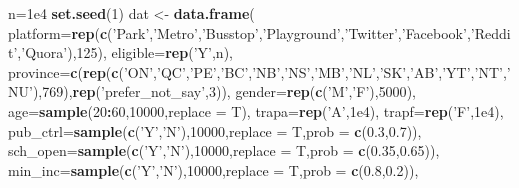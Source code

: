 \documentclass[
]{article}
\newenvironment{Shaded}{\begin{snugshade}}{\end{snugshade}}
\newcommand{\DataTypeTok}[1]{\textcolor[rgb]{0.13,0.29,0.53}{#1}}
\newcommand{\DecValTok}[1]{\textcolor[rgb]{0.00,0.00,0.81}{#1}}
\newcommand{\FloatTok}[1]{\textcolor[rgb]{0.00,0.00,0.81}{#1}}
\newcommand{\KeywordTok}[1]{\textcolor[rgb]{0.13,0.29,0.53}{\textbf{#1}}}
\newcommand{\NormalTok}[1]{#1}
\newcommand{\OperatorTok}[1]{\textcolor[rgb]{0.81,0.36,0.00}{\textbf{#1}}}
\newcommand{\StringTok}[1]{\textcolor[rgb]{0.31,0.60,0.02}{#1}}
\begin{document}
\begin{Shaded}
\begin{Highlighting}[]
\NormalTok{n=}\FloatTok{1e4}
\KeywordTok{set.seed}\NormalTok{(}\DecValTok{1}\NormalTok{)}
\NormalTok{dat <-}\StringTok{ }\KeywordTok{data.frame}\NormalTok{(}
  \DataTypeTok{platform=}\KeywordTok{rep}\NormalTok{(}\KeywordTok{c}\NormalTok{(}\StringTok{'Park'}\NormalTok{,}\StringTok{'Metro'}\NormalTok{,}\StringTok{'Busstop'}\NormalTok{,}\StringTok{'Playground'}\NormalTok{,}\StringTok{'Twitter'}\NormalTok{,}\StringTok{'Facebook'}\NormalTok{,}\StringTok{'Reddit'}\NormalTok{,}\StringTok{'Quora'}\NormalTok{),}\DecValTok{125}\NormalTok{),}
  \DataTypeTok{eligible=}\KeywordTok{rep}\NormalTok{(}\StringTok{'Y'}\NormalTok{,n),}
  \DataTypeTok{province=}\KeywordTok{c}\NormalTok{(}\KeywordTok{rep}\NormalTok{(}\KeywordTok{c}\NormalTok{(}\StringTok{'ON'}\NormalTok{,}\StringTok{'QC'}\NormalTok{,}\StringTok{'PE'}\NormalTok{,}\StringTok{'BC'}\NormalTok{,}\StringTok{'NB'}\NormalTok{,}\StringTok{'NS'}\NormalTok{,}\StringTok{'MB'}\NormalTok{,}\StringTok{'NL'}\NormalTok{,}\StringTok{'SK'}\NormalTok{,}\StringTok{'AB'}\NormalTok{,}\StringTok{'YT'}\NormalTok{,}\StringTok{'NT'}\NormalTok{,}\StringTok{'NU'}\NormalTok{),}\DecValTok{769}\NormalTok{),}\KeywordTok{rep}\NormalTok{(}\StringTok{'prefer_not_say'}\NormalTok{,}\DecValTok{3}\NormalTok{)),}
  \DataTypeTok{gender=}\KeywordTok{rep}\NormalTok{(}\KeywordTok{c}\NormalTok{(}\StringTok{'M'}\NormalTok{,}\StringTok{'F'}\NormalTok{),}\DecValTok{5000}\NormalTok{),}
  \DataTypeTok{age=}\KeywordTok{sample}\NormalTok{(}\DecValTok{20}\OperatorTok{:}\DecValTok{60}\NormalTok{,}\DecValTok{10000}\NormalTok{,}\DataTypeTok{replace =}\NormalTok{ T),}
  \DataTypeTok{trapa=}\KeywordTok{rep}\NormalTok{(}\StringTok{'A'}\NormalTok{,}\FloatTok{1e4}\NormalTok{),}
  \DataTypeTok{trapf=}\KeywordTok{rep}\NormalTok{(}\StringTok{'F'}\NormalTok{,}\FloatTok{1e4}\NormalTok{),}
  \DataTypeTok{pub_ctrl=}\KeywordTok{sample}\NormalTok{(}\KeywordTok{c}\NormalTok{(}\StringTok{'Y'}\NormalTok{,}\StringTok{'N'}\NormalTok{),}\DecValTok{10000}\NormalTok{,}\DataTypeTok{replace =}\NormalTok{ T,}\DataTypeTok{prob =} \KeywordTok{c}\NormalTok{(}\FloatTok{0.3}\NormalTok{,}\FloatTok{0.7}\NormalTok{)),}
  \DataTypeTok{sch_open=}\KeywordTok{sample}\NormalTok{(}\KeywordTok{c}\NormalTok{(}\StringTok{'Y'}\NormalTok{,}\StringTok{'N'}\NormalTok{),}\DecValTok{10000}\NormalTok{,}\DataTypeTok{replace =}\NormalTok{ T,}\DataTypeTok{prob =} \KeywordTok{c}\NormalTok{(}\FloatTok{0.35}\NormalTok{,}\FloatTok{0.65}\NormalTok{)),}
  \DataTypeTok{min_inc=}\KeywordTok{sample}\NormalTok{(}\KeywordTok{c}\NormalTok{(}\StringTok{'Y'}\NormalTok{,}\StringTok{'N'}\NormalTok{),}\DecValTok{10000}\NormalTok{,}\DataTypeTok{replace =}\NormalTok{ T,}\DataTypeTok{prob =} \KeywordTok{c}\NormalTok{(}\FloatTok{0.8}\NormalTok{,}\FloatTok{0.2}\NormalTok{)),}

\end{Highlighting}
\end{Shaded}
\end{document}
